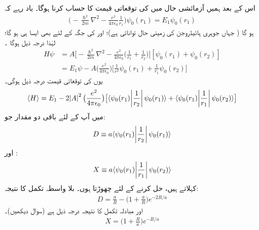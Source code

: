  اس کے بعد ہمیں آزمائشی حال    میں  کی توقعاتی قیمت کا حساب کرنا ہوگا۔ یاد رہے کہ 
 \begin{align*}
\big(-\frac{\hslash^{2}}{2m}\nabla^{2}-\frac{e^{2}}{4\pi\epsilon_{0}}\frac{1}{r_{1}}\big)\psi_{0}(r_{1})=E_{1}\psi_{0}(r_{1})
\end{align*}
ہو گا (  جہاں     جوہری ہائیڈروجن کی زمینی حال توانائی ہے)؛  اور  کی جگہ  کے لئے بھی ایسا ہی   ہو گا؛ لہٰذا  درجہ ذیل ہوگا ۔
\begin{align*}
 H\psi&=A\big[-\frac{\hslash^{2}}{2m}\nabla^{2}-\frac{e^{2}}{4\pi\epsilon_{0}}\big(\frac{1}{r_{1}}+\frac{1}{r_{2}}\big)\big][\psi_{0}(r_{1})+\psi_{0}(r_{2})]\\
&=E_{1}\psi-A\big(\frac{e^{2}}{4\pi\epsilon_{0}}\big)\big[\frac{1}{r^{2}}\psi_{0}(r_{1})+\frac{1}{r_{1}}\psi_{0}(r_{2})\big]
\end{align*}
 یوں کی توقعاتی قیمت درجہ ذیل ہوگی۔
\begin{align}
\langle H \rangle =E_{1}-2\abs{A}^{2}\big(\frac{e^{2}}{4\pi\epsilon_{0}}\big)\big[\langle \psi_{0}(r_{1})\abs{\frac{1}{r_{2}}}\psi_{0}(r_{1})\rangle +\langle \psi_{0}(r_{1})\abs{\frac{1}{r_{1}}}\psi_{0}(r_{2})\rangle\big]
\end{align}
 میں آپ کے لئے باقی دو مقدار جو: 
\begin{align}
D\equiv a\langle \psi_{0}(r_{1})\abs{\frac{1}{r_{2}}}\psi_{0}(r_{1})\rangle
\end{align}
 اور  : 
\begin{align}
X\equiv a\langle\psi_{0}(r_{1})\abs{\frac{1}{r_{1}}}\psi_{0}(r_{2})\rangle
\end{align}
 کہلاتے ہیں،  حل کرنے کے لئے چھوڑتا ہوں۔ بلا واسطہ تکمل کا نتیجہ:
\begin{align}
D=\frac{a}{R}-\big(1+\frac{a}{R}\big)e^{-2R/a} 
\end{align}
 اور مبادلہ تکمل کا نتیجہ درجہ ذیل ہے  (سوال  دیکھیں)۔  
\begin{align}
X=\big(1+\frac{R}{a}\big)e^{-R/a} 
\end{align}

